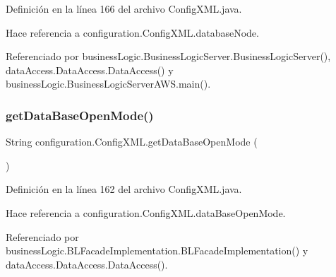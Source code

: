 Definición en la línea 166 del archivo Config\+X\+M\+L.\+java.


\begin{DoxyCode}{0}

\end{DoxyCode}


Hace referencia a configuration.\+Config\+X\+M\+L.\+database\+Node.



Referenciado por business\+Logic.\+Business\+Logic\+Server.\+Business\+Logic\+Server(), data\+Access.\+Data\+Access.\+Data\+Access() y business\+Logic.\+Business\+Logic\+Server\+A\+W\+S.\+main().

\mbox{\label{classconfiguration_1_1ConfigXML_a693787d7818204c9188cb0c03d9423a0}} 
\subsubsection{\texorpdfstring{getDataBaseOpenMode()}{getDataBaseOpenMode()}}
{\footnotesize\ttfamily String configuration.\+Config\+X\+M\+L.\+get\+Data\+Base\+Open\+Mode (\begin{DoxyParamCaption}{ }\end{DoxyParamCaption})}



Definición en la línea 162 del archivo Config\+X\+M\+L.\+java.


\begin{DoxyCode}{0}

\end{DoxyCode}


Hace referencia a configuration.\+Config\+X\+M\+L.\+data\+Base\+Open\+Mode.



Referenciado por business\+Logic.\+B\+L\+Facade\+Implementation.\+B\+L\+Facade\+Implementation() y data\+Access.\+Data\+Access.\+Data\+Access().

